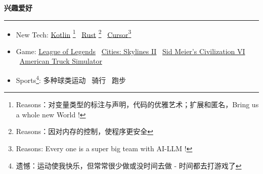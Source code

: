 \documentclass[11pt,a4paper]{article}
\renewcommand{\section}[1]{%
    \vspace{0.6em}%
    {\sffamily\Large\bfseries\color{sectioncolor}#1}%
    \vspace{0.2em}%
    \hrule height 0.5pt
    \vspace{0.4em}%
}
\newcommand{\separator}{\textbullet~}  %
\begin{document}
\section{兴趣爱好}
\begin{itemize}
    \item New Tech: \href{https://kotlinlang.org/}{Kotlin} \footnote{Reasons：对变量类型的标注与声明，代码的优雅艺术；扩展和匿名，Bring us a whole new World ! } \separator \href{https://www.rust-lang.org/}{Rust} \footnote{Reasons：因对内存的控制，使程序更安全} \separator \href{https://www.cursor.com/}{Cursor\footnote{Reasons: Every one is a super big team with AI-LLM ! }}
    \item Game: \href{https://lol.qq.com/}{League of Legends} \separator \href{https://store.steampowered.com/app/949230/Cities_Skylines_II/}{Cities: Skylines II} \separator \href{https://store.steampowered.com/app/289070/Sid_Meiers_Civilization_VI/}{Sid Meier's Civilization VI} \separator \href{https://store.steampowered.com/app/270880/American_Truck_Simulator/}{American Truck Simulator}
    \item Sports\footnote{遗憾：运动使我快乐，但常常很少做或没时间去做 - 时间都去打游戏了}: 多种球类运动 \separator 骑行 \separator 跑步 
\end{itemize}
\end{document}
